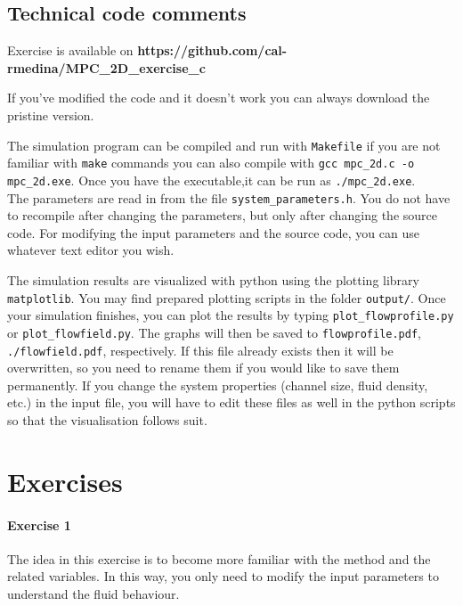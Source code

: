 \documentclass[sizes,12pt,nftimes]{article}
\begin{document}
\subsection*{Technical code comments }

Exercise is available on \mbox{\bf https://github.com/cal-rmedina/MPC\_2D\_exercise\_c} 
 
\noindent If you've modified the code and it doesn't work you can always download the pristine version.
 
\vspace*{0.2cm}
The simulation program can be compiled and run with \mbox{\texttt{Makefile}}
if you are not familiar with \mbox{\texttt{make}} commands you can also compile
with \mbox{\texttt{gcc mpc\_2d.c -o mpc\_2d.exe}}. 
Once you have the executable,it can be run as \mbox{\texttt{./mpc\_2d.exe}}.\\
The parameters are read in from the file \mbox{\texttt{system\_parameters.h}}.
You do not have to recompile after changing the parameters, but only after changing
the source code. For modifying the input parameters and the source code,
you can use whatever text editor you wish. 
  
The simulation results are visualized with python using the plotting
library \mbox{\texttt{matplotlib}}. You may find prepared plotting scripts in the
folder \mbox{\texttt{output/}}. Once your simulation finishes, you can
plot the results by typing \mbox{\texttt{plot\_flowprofile.py}} or
\mbox{\texttt{plot\_flowfield.py}}. The graphs will then be saved to
\mbox{\texttt{flowprofile.pdf}}, \mbox{\texttt{./flowfield.pdf}},
respectively. If this file already exists then it will be overwritten,
so you need to rename them if you would like to save them
permanently. If you change the system properties (channel size, fluid
density, etc.) in the input file, you will have to edit these files as
well in the python scripts so that the visualisation follows suit.
  
\newpage
\section*{Exercises}
 
\paragraph*{Exercise 1} The idea in this exercise is to become more familiar
with the method and the related variables. In this way, you only need
to modify the input parameters to understand the fluid behaviour.
\end{document}
